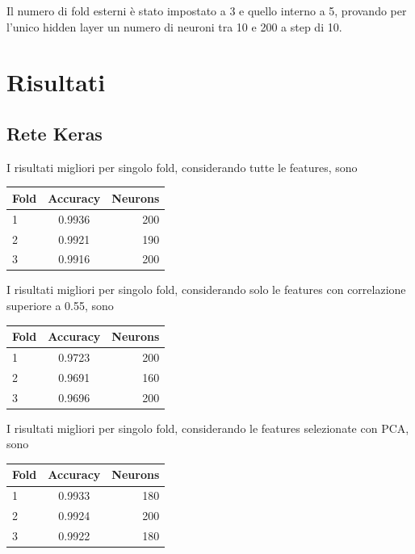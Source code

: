 \documentclass[12pt]{report}
\begin{document}
Il numero di fold esterni è stato impostato a 3 e quello interno a 5, provando per l'unico hidden layer un numero di neuroni tra 10 e 200 a step di 10.

\section{Risultati}

\subsection{Rete Keras}

I risultati migliori per singolo fold, considerando tutte le features, sono
\begin{center}
\begin{tabular}{lcr}
\toprule
Fold & Accuracy & Neurons \\
\midrule
1  & 0.9936 & 200\\
2  & 0.9921 & 190\\
3  & 0.9916 & 200\\
\bottomrule
\end{tabular}
\end{center}

\par\null\par
\par\null\par

I risultati migliori per singolo fold, considerando solo le features con correlazione superiore a 0.55, sono

\begin{center}
\begin{tabular}{lcr}
\toprule
Fold & Accuracy & Neurons \\
\midrule
1  & 0.9723 & 200\\
2  & 0.9691 & 160\\
3  & 0.9696 & 200\\
\bottomrule
\end{tabular}
\end{center}

\par\null\par
\par\null\par

I risultati migliori per singolo fold, considerando le features selezionate con PCA, sono

\begin{center}
\begin{tabular}{lcr}
\toprule
Fold & Accuracy & Neurons \\
\midrule
1  & 0.9933 & 180\\
2  & 0.9924 & 200\\
3  & 0.9922 & 180\\
\bottomrule
\end{tabular}
\end{center}
\end{document}
